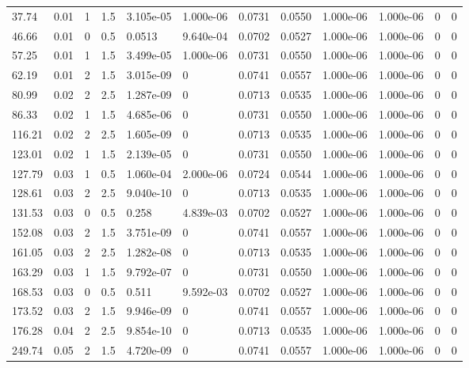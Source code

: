 \documentclass[preview]{standalone}
\begin{document}
{{\begin{tabular}{L{1.2cm}C{1.2cm} C{0.3cm}C{0.5cm} C{1.4cm}C{1.4cm} C{1.4cm}C{1.4cm} C{1.6cm}C{1.6cm} C{1.6cm}C{1.6cm}}
  37.74  &  0.01  & 1     & 1.5 &  3.105e-05  & 1.000e-06  &  0.0731&   0.0550& 1.000e-06 & 1.000e-06   &  0 & 0  \\ 
  46.66  &  0.01  & 0     & 0.5 &  0.0513  & 9.640e-04  &  0.0702&   0.0527& 1.000e-06 & 1.000e-06   &  0 & 0  \\ 
  57.25  &  0.01  & 1     & 1.5 &  3.499e-05  & 1.000e-06  &  0.0731&   0.0550& 1.000e-06 & 1.000e-06   &  0 & 0  \\ 
  62.19  &  0.01  & 2     & 1.5 &  3.015e-09  & 0  &  0.0741&   0.0557& 1.000e-06 & 1.000e-06   &  0 & 0  \\ 
  80.99  &  0.02  & 2     & 2.5 &  1.287e-09  & 0  &  0.0713&   0.0535& 1.000e-06 & 1.000e-06   &  0 & 0  \\ 
  86.33  &  0.02  & 1     & 1.5 &  4.685e-06  & 0  &  0.0731&   0.0550& 1.000e-06 & 1.000e-06   &  0 & 0  \\ 
  116.21  &  0.02  & 2     & 2.5 &  1.605e-09  & 0  &  0.0713&   0.0535& 1.000e-06 & 1.000e-06   &  0 & 0  \\ 
  123.01  &  0.02  & 1     & 1.5 &  2.139e-05  & 0  &  0.0731&   0.0550& 1.000e-06 & 1.000e-06   &  0 & 0  \\ 
  127.79  &  0.03  & 1     & 0.5 &  1.060e-04  & 2.000e-06  &  0.0724&   0.0544& 1.000e-06 & 1.000e-06   &  0 & 0  \\ 
  128.61  &  0.03  & 2     & 2.5 &  9.040e-10  & 0  &  0.0713&   0.0535& 1.000e-06 & 1.000e-06   &  0 & 0  \\ 
  131.53  &  0.03  & 0     & 0.5 &  0.258  & 4.839e-03  &  0.0702&   0.0527& 1.000e-06 & 1.000e-06   &  0 & 0  \\ 
  152.08  &  0.03  & 2     & 1.5 &  3.751e-09  & 0  &  0.0741&   0.0557& 1.000e-06 & 1.000e-06   &  0 & 0  \\ 
  161.05  &  0.03  & 2     & 2.5 &  1.282e-08  & 0  &  0.0713&   0.0535& 1.000e-06 & 1.000e-06   &  0 & 0  \\ 
  163.29  &  0.03  & 1     & 1.5 &  9.792e-07  & 0  &  0.0731&   0.0550& 1.000e-06 & 1.000e-06   &  0 & 0  \\ 
  168.53  &  0.03  & 0     & 0.5 &  0.511  & 9.592e-03  &  0.0702&   0.0527& 1.000e-06 & 1.000e-06   &  0 & 0  \\ 
  173.52  &  0.03  & 2     & 1.5 &  9.946e-09  & 0  &  0.0741&   0.0557& 1.000e-06 & 1.000e-06   &  0 & 0  \\ 
  176.28  &  0.04  & 2     & 2.5 &  9.854e-10  & 0  &  0.0713&   0.0535& 1.000e-06 & 1.000e-06   &  0 & 0  \\ 
  249.74  &  0.05  & 2     & 1.5 &  4.720e-09  & 0  &  0.0741&   0.0557& 1.000e-06 & 1.000e-06   &  0 & 0  \\ 

\end{tabular}}}
\end{document}
